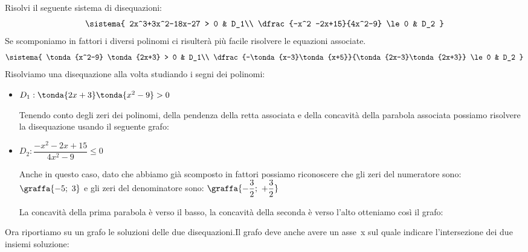 \begin{esempio}

Risolvi il seguente sistema di disequazioni:
\[\sistema{
    2x^3+3x^2-18x-27 > 0 & D_1\\
    \dfrac{-x^2 -2x+15}{4x^2-9} \le 0 & D_2
  }
\]
Se scomponiamo in fattori i diversi polinomi ci risulterà più facile
risolvere le equazioni associate.
\[\sistema{
    \tonda{x^2-9} \tonda{2x+3} > 0 & D_1\\
    \dfrac{-\tonda{x-3}\tonda{x+5}}{\tonda{2x-3}\tonda{2x+3}} \le 0 & D_2
  }
\]
Risolviamo una disequazione alla volta studiando i segni dei polinomi:

\begin{itemize}
 \item \(D_1: \tonda{2x+3} \tonda{x^2-9}>0\)

\begin{minipage}{.49\textwidth}
Tenendo conto degli zeri dei polinomi, della pendenza della retta associata
e della concavità della parabola associata possiamo risolvere la disequazione
usando il seguente grafo:
\end{minipage}
\hfill
\begin{minipage}{.49\textwidth}
\begin{center} \segnosistemaaa \end{center}
\end{minipage}

 \item \(D_2: \dfrac{-x^2 -2x+15}{4x^2-9} \le 0\)

Anche in questo caso, dato che abbiamo già scomposto in fattori possiamo
riconoscere che gli zeri del numeratore sono:
\(\graffa{-5;~3}\)
e gli zeri del denominatore sono:
\(\graffa{-\dfrac{3}{2};~+\dfrac{3}{2}}\)

La concavità della prima parabola è verso il basso,
la concavità della seconda è verso l'alto otteniamo così il grafo:

\begin{center} \segnosistemaab \end{center}

\end{itemize}

\begin{minipage}{.49\textwidth}
Ora riportiamo su un grafo le soluzioni delle due disequazioni.Il grafo deve
anche avere un asse~x sul quale indicare l'intersezione dei due insiemi
soluzione:
\end{minipage}
\hfill
\begin{minipage}{.49\textwidth}
\begin{center} \sistemaa \end{center}
\end{minipage}


\end{esempio}
